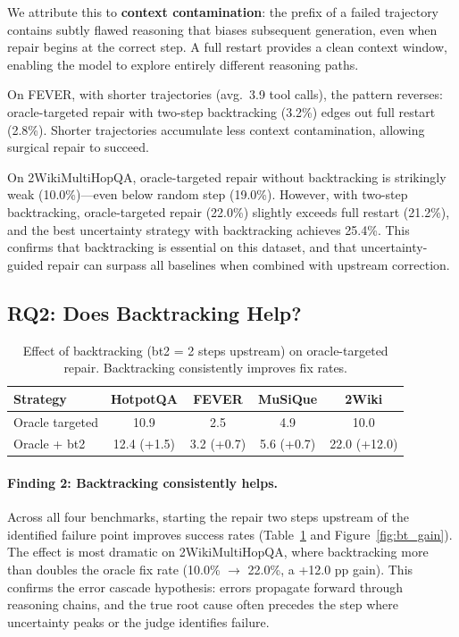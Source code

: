 \documentclass[letterpaper]{article}
\begin{document}
We attribute this to \textbf{context contamination}: the prefix of a failed trajectory contains subtly flawed reasoning that biases subsequent generation, even when repair begins at the correct step. A full restart provides a clean context window, enabling the model to explore entirely different reasoning paths.

On FEVER, with shorter trajectories (avg.\ 3.9 tool calls), the pattern reverses: oracle-targeted repair with two-step backtracking (3.2\%) edges out full restart (2.8\%). Shorter trajectories accumulate less context contamination, allowing surgical repair to succeed.

On 2WikiMultiHopQA, oracle-targeted repair without backtracking is strikingly weak (10.0\%)---even below random step (19.0\%). However, with two-step backtracking, oracle-targeted repair (22.0\%) slightly exceeds full restart (21.2\%), and the best uncertainty strategy with backtracking achieves 25.4\%. This confirms that backtracking is essential on this dataset, and that uncertainty-guided repair can surpass all baselines when combined with upstream correction.

\subsection{RQ2: Does Backtracking Help?}

\begin{table}[t]
\centering
\caption{Effect of backtracking (bt2 = 2 steps upstream) on oracle-targeted repair. Backtracking consistently improves fix rates.}
\label{tab:backtrack}
\scriptsize
\setlength{\tabcolsep}{3pt}
\begin{tabular}{@{}lcccc@{}}
\toprule
\textbf{Strategy} & \textbf{HotpotQA} & \textbf{FEVER} & \textbf{MuSiQue} & \textbf{2Wiki} \\
\midrule
Oracle targeted & 10.9 & 2.5 & 4.9 & 10.0 \\
Oracle + bt2 & 12.4 (+1.5) & 3.2 (+0.7) & 5.6 (+0.7) & 22.0 (+12.0) \\
\bottomrule
\end{tabular}
\end{table}

\paragraph{Finding 2: Backtracking consistently helps.} Across all four benchmarks, starting the repair two steps upstream of the identified failure point improves success rates (Table~\ref{tab:backtrack} and Figure~\ref{fig:bt_gain}). The effect is most dramatic on 2WikiMultiHopQA, where backtracking more than doubles the oracle fix rate (10.0\% $\to$ 22.0\%, a +12.0 pp gain). This confirms the error cascade hypothesis: errors propagate forward through reasoning chains, and the true root cause often precedes the step where uncertainty peaks or the judge identifies failure.
\end{document}
